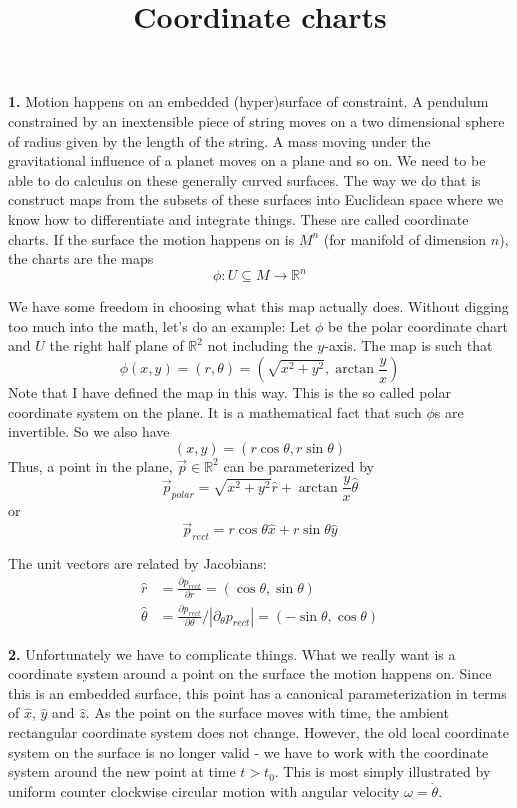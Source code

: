\documentclass{article}
\title{Coordinate charts}
\begin{document}
\maketitle

\textbf{1.} Motion happens on an embedded (hyper)surface of constraint. A pendulum constrained by an inextensible piece of string moves on a two dimensional sphere of radius given by the length of the string. A mass moving under the gravitational influence of a planet moves on a plane and so on. We need to be able to do calculus on these generally curved surfaces. The way we do that is construct maps from the subsets of these surfaces into Euclidean space where we know how to differentiate and integrate things. These are called coordinate charts. If the surface the motion happens on is $M^n$ (for manifold of dimension $n$), the charts are the maps 
$$
\phi :U\subseteq M \to \mathbb R^n 
$$

We have some freedom in choosing what this map actually does. Without digging too much into the math, let's do an example: Let $\phi$ be the polar coordinate chart and $U$ the right half plane of $\mathbb R^2$ not including the $y$-axis. The map is such that 
$$
\phi(x,y) = (r,\theta)=(\sqrt{x^2+y^2}, \arctan \frac{y}{x})
$$
Note that I have defined the map in this way. This is the so called polar coordinate system on the plane. It is a mathematical fact that such $\phi$s are invertible. So we also have 
$$
(x,y)=(r\cos \theta, r\sin\theta)
$$
Thus, a point in the plane, $\vec p\in \mathbb R^2$ can be parameterized by
$$
\vec p_{polar} = \sqrt{x^2+y^2}\hat r +\arctan \frac{y}{x} \hat \theta
$$
or 
$$
\vec p_{rect} = r\cos\theta \hat x+r\sin\theta \hat y
$$

The unit vectors are related by Jacobians:
$$
\begin{aligned}
\hat r&=\frac{\partial p_{rect}}{\partial r} = (\cos \theta, \sin \theta)\\
\hat \theta &= \frac{\partial p_{rect}}{\partial \theta}/|\partial_\theta p_{rect}|= (-\sin \theta, \cos \theta)
\end{aligned}
$$

\textbf{2.} Unfortunately we have to complicate things. What we really want is a coordinate system around a point on the surface the motion happens on. Since this is an embedded surface, this point has a canonical parameterization in terms of $\hat x$, $\hat y$ and $\hat z$. As the point on the surface moves with time, the ambient rectangular coordinate system does not change. However, the old local coordinate system on the surface is no longer valid - we have to work with the coordinate system around the new point at time $t>t_0$. This is most simply illustrated by uniform counter clockwise circular motion with angular velocity $\omega=\dot \theta$.
\end{document}
